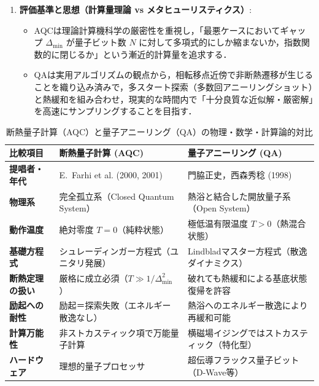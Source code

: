 \documentclass[11pt,a4paper,oneside,openany]{ltjsbook}
\theoremstyle{definition}
\theoremstyle{plain}
\theoremstyle{remark}
\begin{document}
\begin{enumerate}
    \item \textbf{評価基準と思想（計算量理論 vs メタヒューリスティクス）}:
    \begin{itemize}
        \item AQCは理論計算機科学の厳密性を重視し，「最悪ケースにおいてギャップ $\Delta_{\min}$ が量子ビット数 $N$ に対して多項式的にしか縮まないか，指数関数的に閉じるか」という漸近的計算量を追求する．
        \item QAは実用アルゴリズムの観点から，相転移点近傍で非断熱遷移が生じることを織り込み済みで，多スタート探索（多数回アニーリングショット）と熱緩和を組み合わせ，現実的な時間内で「十分良質な近似解・厳密解」を高速にサンプリングすることを目指す．
    \end{itemize}
\end{enumerate}

\begin{table}[htbp]
\centering
\caption{断熱量子計算（AQC）と量子アニーリング（QA）の物理・数学・計算論的対比}
\label{tab:aqc_vs_qa}
\begin{tabularx}{\textwidth}{l X X}
\toprule
\textbf{比較項目} & \textbf{断熱量子計算 (AQC)} & \textbf{量子アニーリング (QA)} \\
\midrule
\textbf{提唱者・年代} & E.~Farhi et al. (2000, 2001)\cite{farhi2000quantum,farhi2001quantum} & 門脇正史，西森秀稔 (1998)\cite{kadowaki1998quantum} \\
\textbf{物理系} & 完全孤立系（Closed Quantum System） & 熱浴と結合した開放量子系（Open System） \\
\textbf{動作温度} & 絶対零度 $T = 0$（純粋状態） & 極低温有限温度 $T > 0$（熱混合状態） \\
\textbf{基礎方程式} & シュレーディンガー方程式（ユニタリ発展） & Lindbladマスター方程式（散逸ダイナミクス） \\
\textbf{断熱定理の扱い} & 厳格に成立必須（$T \gg 1/\Delta_{\min}^2$） & 破れても熱緩和による基底状態復帰を許容 \\
\textbf{励起への耐性} & 励起＝探索失敗（エネルギー散逸なし） & 熱浴へのエネルギー散逸により再緩和可能 \\
\textbf{計算万能性} & 非ストカスティック項で万能量子計算\cite{aharonov2007adiabatic} & 横磁場イジングではストカスティック（特化型） \\
\textbf{ハードウェア} & 理想的量子プロセッサ & 超伝導フラックス量子ビット（D-Wave等） \\
\bottomrule
\end{tabularx}
\end{table}
\end{document}
